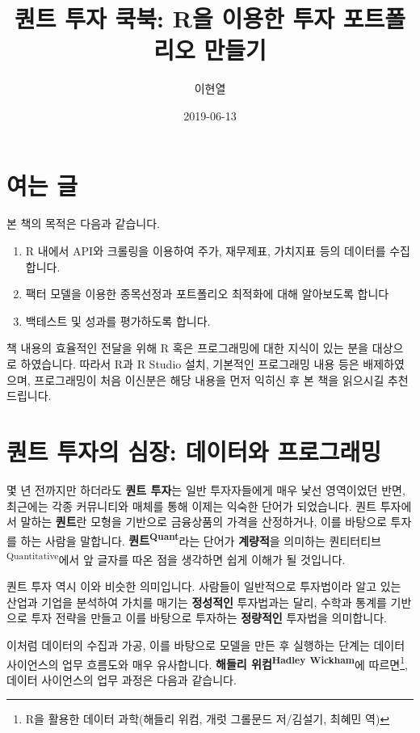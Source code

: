 \documentclass[]{book}
\title{퀀트 투자 쿡북: R을 이용한 투자 포트폴리오 만들기}
\author{이현열}
\date{2019-06-13}
\providecommand{\tightlist}{%
  \setlength{\itemsep}{0pt}\setlength{\parskip}{0pt}}
\let\rmarkdownfootnote\footnote%
\def\footnote{\protect\rmarkdownfootnote}
\begin{document}
\maketitle

{
\setcounter{tocdepth}{1}
\tableofcontents
}
\hypertarget{section}{%
\chapter*{여는 글}\label{section}}

본 책의 목적은 다음과 같습니다.

\begin{enumerate}
\def\labelenumi{\arabic{enumi}.}
\tightlist
\item
  R 내에서 API와 크롤링을 이용하여 주가, 재무제표, 가치지표 등의 데이터를 수집합니다.
\item
  팩터 모델을 이용한 종목선정과 포트폴리오 최적화에 대해 알아보도록 합니다
\item
  백테스트 및 성과를 평가하도록 합니다.
\end{enumerate}

책 내용의 효율적인 전달을 위해 R 혹은 프로그래밍에 대한 지식이 있는 분을 대상으로 하였습니다. 따라서 R과 R Studio 설치, 기본적인 프로그래밍 내용 등은 배제하였으며, 프로그래밍이 처음 이신분은 해당 내용을 먼저 익히신 후 본 책을 읽으시길 추천드립니다.

\hypertarget{section-1}{%
\chapter{퀀트 투자의 심장: 데이터와 프로그래밍}\label{section-1}}

몇 년 전까지만 하더라도 \textbf{퀀트 투자}는 일반 투자자들에게 매우 낯선 영역이었던 반면, 최근에는 각종 커뮤니티와 매체를 통해 이제는 익숙한 단어가 되었습니다. 퀀트 투자에서 말하는 \textbf{퀀트}란 모형을 기반으로 금융상품의 가격을 산정하거나, 이를 바탕으로 투자를 하는 사람을 말합니다. \textbf{퀀트\textsuperscript{Quant}}라는 단어가 \textbf{계량적}을 의미하는 퀀티터티브\textsuperscript{Quantitative}에서 앞 글자를 따온 점을 생각하면 쉽게 이해가 될 것입니다.

퀀트 투자 역시 이와 비슷한 의미입니다. 사람들이 일반적으로 투자법이라 알고 있는 산업과 기업을 분석하여 가치를 매기는 \textbf{정성적인} 투자법과는 달리, 수학과 통계를 기반으로 투자 전략을 만들고 이를 바탕으로 투자하는 \textbf{정량적인} 투자법을 의미합니다.

이처럼 데이터의 수집과 가공, 이를 바탕으로 모델을 만든 후 실행하는 단계는 데이터 사이언스의 업무 흐름도와 매우 유사합니다. \textbf{해들리 위컴\textsuperscript{Hadley} \textsuperscript{Wickham}}에 따르면\footnote{R을 활용한 데이터 과학(해들리 위컴, 개럿 그롤문드 저/김설기, 최혜민 역)}, 데이터 사이언스의 업무 과정은 다음과 같습니다.
\end{document}

